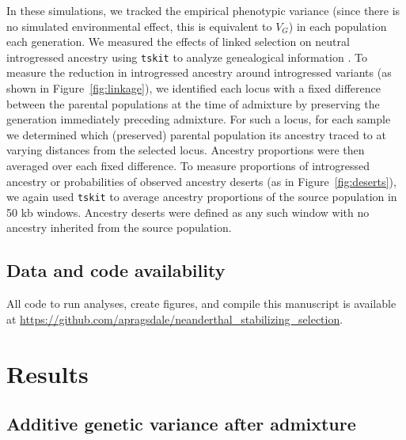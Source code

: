\documentclass{article}
\newcommand{\tskit}{\texttt{tskit}\xspace}
\begin{document}
In these simulations, we tracked the empirical phenotypic variance (since there
is no simulated environmental effect, this is equivalent to $V_G$) in each
population each generation. We measured the effects of linked selection on
neutral introgressed ancestry using \tskit to analyze genealogical
information \citep{ralph2020efficiently}. To measure the reduction in
introgressed ancestry around introgressed variants (as shown in
Figure~\ref{fig:linkage}), we identified each locus with a fixed difference
between the parental populations at the time of admixture by preserving the
generation immediately preceding admixture. For such a locus, for each sample
we determined which (preserved) parental population its ancestry traced to at
varying distances from the selected locus. Ancestry proportions were then
averaged over each fixed difference. To measure proportions of introgressed
ancestry or probabilities of observed ancestry deserts (as in
Figure~\ref{fig:deserts}), we again used \tskit to average ancestry proportions
of the source population in 50 kb windows. Ancestry deserts were defined as
any such window with no ancestry inherited from the source population.

\subsection*{Data and code availability}

All code to run analyses, create figures, and compile this manuscript is
available at
\url{https://github.com/apragsdale/neanderthal_stabilizing_selection}.

\section*{Results}


\subsection*{Additive genetic variance after admixture}
\end{document}
